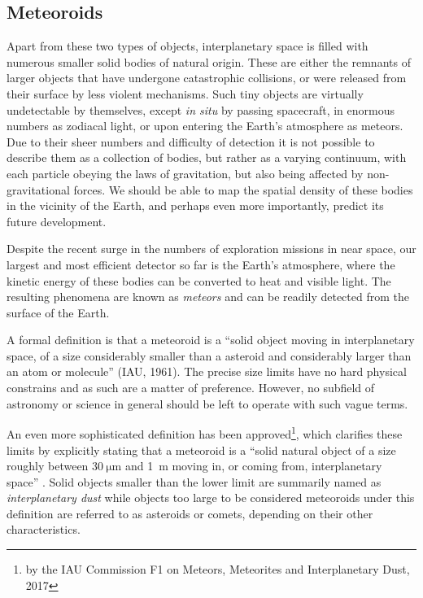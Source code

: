     \subsection{Meteoroids} \label{iam}
        Apart from these two types of objects, interplanetary space is filled with numerous
        smaller solid bodies of natural origin. These are either the remnants of larger objects
        that have undergone catastrophic collisions, or were released from their surface by less violent mechanisms.
        Such tiny objects are virtually undetectable by themselves, except \textit{in situ} by passing spacecraft,
        in enormous numbers as zodiacal light, or upon entering the Earth's atmosphere as meteors.
        Due to their sheer numbers and difficulty of detection it is not possible to describe them as a collection of bodies,
        but rather as a varying continuum, with each particle obeying the laws of gravitation, but also being affected by non-gravitational forces.
        We should be able to map the spatial density of these bodies in the vicinity of the Earth,
        and perhaps even more importantly, predict its future development.

        Despite the recent surge in the numbers of exploration missions in near space,
        our largest and most efficient detector so far is the Earth's atmosphere,
        where the kinetic energy of these bodies can be converted to heat and visible light.
        The resulting phenomena are known as \emph{meteors} and can be readily detected from the surface of the Earth.

        A formal definition is that a meteoroid is a ``solid object moving in interplanetary space,
        of a size considerably smaller than a asteroid and considerably larger than an atom or molecule'' (IAU, 1961).
        The precise size limits have no hard physical constrains and as such are a matter of preference.
        However, no subfield of astronomy or science in general should be left to operate with such vague terms.

        An even more sophisticated definition has been approved\footnote{by the IAU Commission
        F1 on Meteors, Meteorites and Interplanetary Dust, 2017},
        which clarifies these limits by explicitly stating that a meteoroid is a ``solid natural object
        of a size roughly between $\SI{30}{\micro\metre}$ and \SI{1}{\metre} moving in, or coming from, interplanetary space'' \citep{imo-definitions}.
        Solid objects smaller than the lower limit are summarily named as \emph{interplanetary dust} while objects
        too large to be considered meteoroids under this definition are referred to as
        asteroids or comets, depending on their other characteristics.

